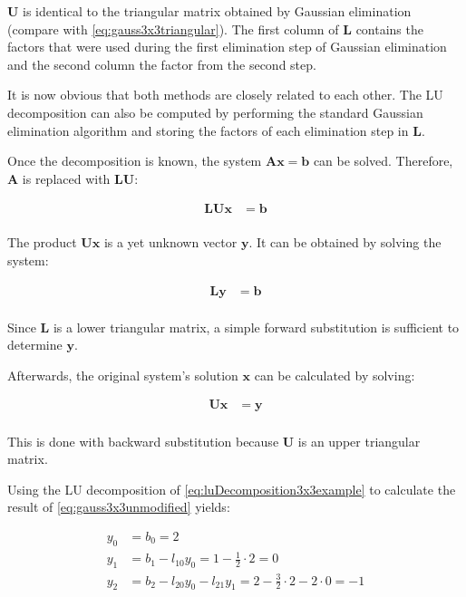 $\mathbf{U}$ is identical to the triangular matrix obtained by Gaussian elimination (compare with \cref{eq:gauss3x3triangular}).
The first column of $\mathbf{L}$ contains the factors that were used during the first elimination step of Gaussian elimination and the second column the factor from the second step.

It is now obvious that both methods are closely related to each other. 
The LU decomposition can also be computed by performing the standard Gaussian elimination algorithm and storing the factors of each elimination step in $\mathbf{L}$.

Once the decomposition is known, the system $\mathbf{A}\mathbf{x} = \mathbf{b}$ can be solved.
Therefore, $\mathbf{A}$ is replaced with $\mathbf{LU}$:

\begin{align*}
\mathbf{LU}\mathbf{x} &= \mathbf{b}\\
\end{align*}

The product $\mathbf{Ux}$ is a yet unknown vector $\mathbf{y}$. 
It can be obtained by solving the system:

\begin{align*}
\mathbf{L}\mathbf{y} &= \mathbf{b}\\
\end{align*}

Since $\mathbf{L}$ is a lower triangular matrix, a simple forward substitution is sufficient to determine $\mathbf{y}$.

Afterwards, the original system's solution $\mathbf{x}$ can be calculated by solving:

\begin{align*}
\mathbf{U}\mathbf{x} &= \mathbf{y}\\
\end{align*}

This is done with backward substitution because $\mathbf{U}$ is an upper triangular matrix.

Using the LU decomposition of \cref{eq:luDecomposition3x3example} to calculate the result of \cref{eq:gauss3x3unmodified} yields:

\begin{align*}
y_0 &= b_0 = 2\\
y_1 &= b_1 - l_{10}y_0 = 1 - \frac{1}{2} \cdot 2 = 0\\
y_2 &= b_2 - l_{20}y_0 - l_{21}y_1 = 2 - \frac{3}{2} \cdot 2 - 2 \cdot 0 = -1
\end{align*}

